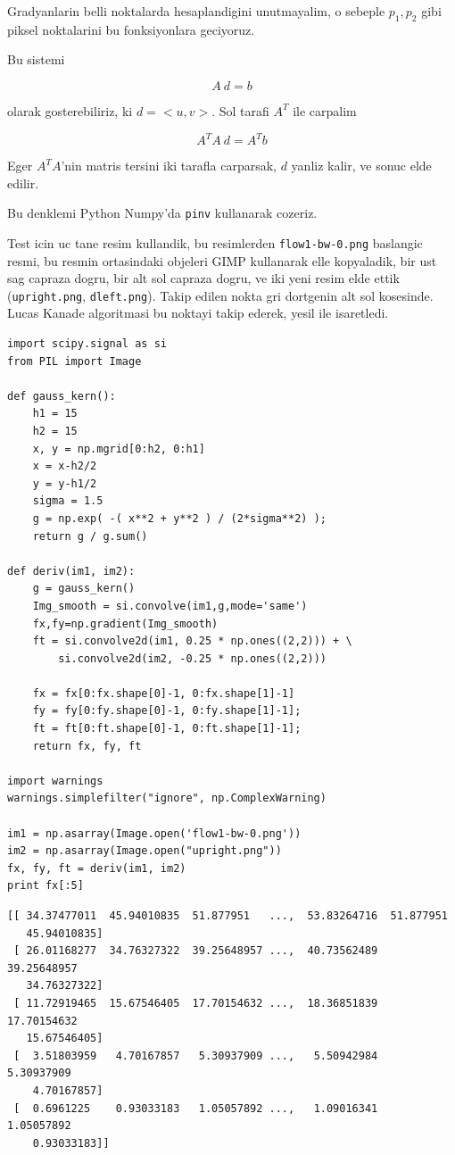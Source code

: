 \documentclass[12pt,fleqn]{article}\usepackage{../common}
\begin{document}
Gradyanlarin belli noktalarda hesaplandigini unutmayalim, o sebeple $p_1,
p_2$ gibi piksel noktalarini bu fonksiyonlara geciyoruz. 

Bu sistemi

$$ A \ d = b $$

olarak gosterebiliriz, ki $d = <u,v>$. Sol tarafi $A^T$ ile carpalim

$$ A^TA \ d = A^Tb $$

Eger $A^TA$'nin matris tersini iki tarafla carparsak, $d$ yanliz kalir, ve
sonuc elde edilir. 

Bu denklemi Python Numpy'da \verb!pinv! kullanarak cozeriz.

Test icin uc tane resim kullandik, bu resimlerden
\verb!flow1-bw-0.png! baslangic resmi, bu resmin ortasindaki
objeleri GIMP kullanarak elle kopyaladik, bir ust sag capraza dogru,
bir alt sol capraza dogru, ve iki yeni resim elde ettik
(\verb!upright.png!, \verb!dleft.png!). Takip edilen nokta
gri dortgenin alt sol kosesinde. Lucas Kanade algoritmasi bu noktayi
takip ederek, yesil ile isaretledi.

\begin{verbatim}
import scipy.signal as si
from PIL import Image

def gauss_kern():
    h1 = 15
    h2 = 15
    x, y = np.mgrid[0:h2, 0:h1]
    x = x-h2/2
    y = y-h1/2
    sigma = 1.5
    g = np.exp( -( x**2 + y**2 ) / (2*sigma**2) );
    return g / g.sum()

def deriv(im1, im2):
    g = gauss_kern()
    Img_smooth = si.convolve(im1,g,mode='same')
    fx,fy=np.gradient(Img_smooth)    
    ft = si.convolve2d(im1, 0.25 * np.ones((2,2))) + \
        si.convolve2d(im2, -0.25 * np.ones((2,2)))
                    
    fx = fx[0:fx.shape[0]-1, 0:fx.shape[1]-1]    
    fy = fy[0:fy.shape[0]-1, 0:fy.shape[1]-1];
    ft = ft[0:ft.shape[0]-1, 0:ft.shape[1]-1];
    return fx, fy, ft

import warnings
warnings.simplefilter("ignore", np.ComplexWarning)

im1 = np.asarray(Image.open('flow1-bw-0.png'))
im2 = np.asarray(Image.open("upright.png"))
fx, fy, ft = deriv(im1, im2)
print fx[:5]
\end{verbatim}

\begin{verbatim}
[[ 34.37477011  45.94010835  51.877951   ...,  53.83264716  51.877951
   45.94010835]
 [ 26.01168277  34.76327322  39.25648957 ...,  40.73562489  39.25648957
   34.76327322]
 [ 11.72919465  15.67546405  17.70154632 ...,  18.36851839  17.70154632
   15.67546405]
 [  3.51803959   4.70167857   5.30937909 ...,   5.50942984   5.30937909
    4.70167857]
 [  0.6961225    0.93033183   1.05057892 ...,   1.09016341   1.05057892
    0.93033183]]
\end{verbatim}
\end{document}
